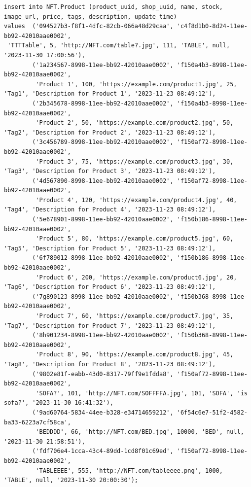 \documentclass[a4paper, 12pt]{article}
\begin{document}
\begin{verbatim}
insert into NFT.Product (product_uuid, shop_uuid, name, stock, image_url, price, tags, description, update_time)
values  ('094527b3-f8f1-4dfc-82cb-066a48d29caa', 'c4f8d1b0-8d24-11ee-bb92-42010aae0002',
 'TTTTable', 5, 'http://NFT.com/table?.jpg', 111, 'TABLE', null, '2023-11-30 17:00:56'),
        ('1a234567-8998-11ee-bb92-42010aae0002', 'f150a4b3-8998-11ee-bb92-42010aae0002',
         'Product 1', 100, 'https://example.com/product1.jpg', 25, 'Tag1', 'Description for Product 1', '2023-11-23 08:49:12'),
        ('2b345678-8998-11ee-bb92-42010aae0002', 'f150a4b3-8998-11ee-bb92-42010aae0002',
         'Product 2', 50, 'https://example.com/product2.jpg', 50, 'Tag2', 'Description for Product 2', '2023-11-23 08:49:12'),
        ('3c456789-8998-11ee-bb92-42010aae0002', 'f150af72-8998-11ee-bb92-42010aae0002',
         'Product 3', 75, 'https://example.com/product3.jpg', 30, 'Tag3', 'Description for Product 3', '2023-11-23 08:49:12'),
        ('4d567890-8998-11ee-bb92-42010aae0002', 'f150af72-8998-11ee-bb92-42010aae0002',
         'Product 4', 120, 'https://example.com/product4.jpg', 40, 'Tag4', 'Description for Product 4', '2023-11-23 08:49:12'),
        ('5e678901-8998-11ee-bb92-42010aae0002', 'f150b186-8998-11ee-bb92-42010aae0002',
         'Product 5', 80, 'https://example.com/product5.jpg', 60, 'Tag5', 'Description for Product 5', '2023-11-23 08:49:12'),
        ('6f789012-8998-11ee-bb92-42010aae0002', 'f150b186-8998-11ee-bb92-42010aae0002',
         'Product 6', 200, 'https://example.com/product6.jpg', 20, 'Tag6', 'Description for Product 6', '2023-11-23 08:49:12'),
        ('7g890123-8998-11ee-bb92-42010aae0002', 'f150b368-8998-11ee-bb92-42010aae0002',
         'Product 7', 60, 'https://example.com/product7.jpg', 35, 'Tag7', 'Description for Product 7', '2023-11-23 08:49:12'),
        ('8h901234-8998-11ee-bb92-42010aae0002', 'f150b368-8998-11ee-bb92-42010aae0002',
         'Product 8', 90, 'https://example.com/product8.jpg', 45, 'Tag8', 'Description for Product 8', '2023-11-23 08:49:12'),
        ('9802e81f-eabb-43d0-8317-79ff9e1fdda8', 'f150af72-8998-11ee-bb92-42010aae0002',
         'SOFA?', 101, 'http://NFT.com/SOFFFFA.jpg', 101, 'SOFA', 'is sofa?', '2023-11-30 16:41:32'),
        ('9ad60764-5834-44ee-b328-e34714659212', '6f54c6e7-51f2-4582-ba33-6223a7cf58ca',
         'BEDDDD', 66, 'http://NFT.com/BED.jpg', 10000, 'BED', null, '2023-11-30 21:58:51'),
        ('fdf706e4-1cca-43c4-89dd-1cd8f01c69ed', 'f150af72-8998-11ee-bb92-42010aae0002',
         'TABLEEEE', 555, 'http://NFT.com/tableeee.png', 1000, 'TABLE', null, '2023-11-30 20:00:30');
        

\end{verbatim}
\end{document}
